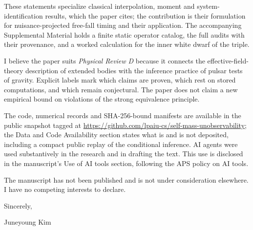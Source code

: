 \documentclass[11pt]{article}
\begin{document}
These statements specialize classical interpolation, moment and system-identification results, which the paper cites; the contribution is their formulation for nuisance-projected free-fall timing and their application. The accompanying Supplemental Material holds a finite static operator catalog, the full audits with their provenance, and a worked calculation for the inner white dwarf of the triple.

I believe the paper suits \emph{Physical Review D} because it connects the effective-field-theory description of extended bodies with the inference practice of pulsar tests of gravity. Explicit labels mark which claims are proven, which rest on stored computations, and which remain conjectural. The paper does not claim a new empirical bound on violations of the strong equivalence principle.

The code, numerical records and SHA-256-bound manifests are available in the public snapshot tagged  at \url{https://github.com/lpaiu-cs/self-mass-unobservability}; the Data and Code Availability section states what is and is not deposited, including a compact public replay of the conditional inference. AI agents were used substantively in the research and in drafting the text. This use is disclosed in the manuscript's Use of AI tools section, following the APS policy on AI tools.

The manuscript has not been published and is not under consideration elsewhere. I have no competing interests to declare.

Sincerely,

Juneyoung Kim
\end{document}
